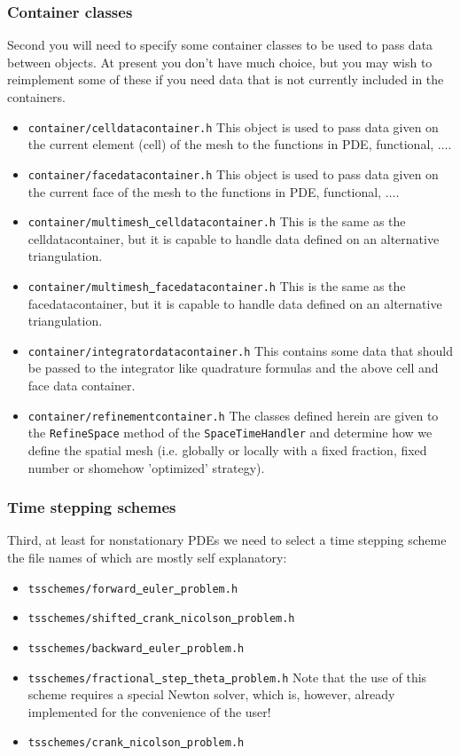 \subsubsection{Container classes}
Second you will need to specify some container classes to be used to 
pass data between objects. At present you don't have much choice, but you may wish 
to reimplement some of these if you need data that is not currently included in 
the containers.
\begin{itemize}
\item \texttt{container/celldatacontainer.h} This object is used to pass data 
  given on the current element (cell) of the mesh to the functions in PDE, functional, 
  $\ldots$. 
\item \texttt{container/facedatacontainer.h} This object is used to pass data 
  given on the current face of the mesh to the functions in PDE, functional, 
  $\ldots$. 
\item \texttt{container/multimesh\underline{ }celldatacontainer.h} This is the same as the 
  celldatacontainer, but it
  is capable to handle data defined on an alternative triangulation.
\item \texttt{container/multimesh\underline{ }facedatacontainer.h} This is the same as the
  facedatacontainer, but it
  is capable to handle data defined on an alternative triangulation.
\item \texttt{container/integratordatacontainer.h} This contains some data that 
  should be passed to the integrator like quadrature formulas and the above cell and 
  face data container.
\item \texttt{container/refinementcontainer.h} The classes defined herein are given to the \texttt{RefineSpace} method of the \texttt{SpaceTimeHandler} and determine how we define the spatial mesh (i.e. globally or locally with a fixed fraction, fixed number or shomehow 'optimized' strategy).
\end{itemize}

\subsubsection{Time stepping schemes}
Third, at least for nonstationary PDEs we need to select a time stepping scheme
the file names of which are mostly self explanatory:
\begin{itemize}
\item \texttt{tsschemes/forward\underline{ }euler\underline{ }problem.h}
\item \texttt{tsschemes/shifted\underline{ }crank\underline{ }nicolson\underline{ }problem.h}
\item \texttt{tsschemes/backward\underline{ }euler\underline{ }problem.h}
\item \texttt{tsschemes/fractional\underline{ }step\underline{ }theta\underline{ }problem.h} Note that the use of this scheme requires a special Newton solver, which is, however, already
implemented for the convenience of the user!
\item \texttt{tsschemes/crank\underline{ }nicolson\underline{ }problem.h}
\end{itemize}

